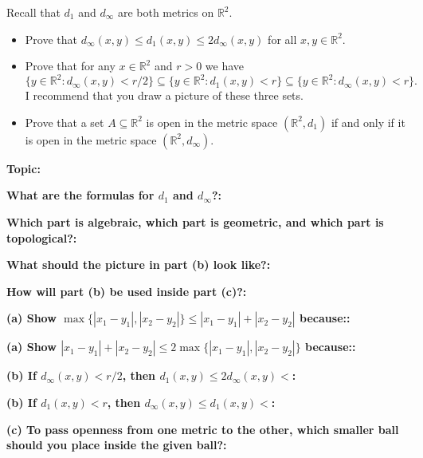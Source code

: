 \documentclass[12pt]{article}
\newcommand{\fillfield}[1]{%
  \par\noindent\textbf{#1:}\enspace\hrulefill\par\vspace{3pt}%
}
\begin{document}
\begin{tcolorbox}[
  enhanced, breakable,
  colback  = probblue,
  colframe = blue!55!black,
  fonttitle = \bfseries,
  title = {\textsc{Problem Statement}\hfill Homework 8, Problem 2}
]
Recall that $d_1$ and $d_\infty$ are both metrics on $\mathbb{R}^2$.
\begin{itemize}[nosep, leftmargin=1.8em]
  \item[(a)] Prove that $d_\infty(x, y) \leq d_1(x, y) \leq 2d_\infty(x, y)$ for all
    $x, y \in \mathbb{R}^2$.
  \item[(b)] Prove that for any $x \in \mathbb{R}^2$ and $r > 0$ we have
\[
  \{y \in \mathbb{R}^2 : d_\infty(x, y) < r/2\}
  \subseteq
  \{y \in \mathbb{R}^2 : d_1(x, y) < r\}
  \subseteq
  \{y \in \mathbb{R}^2 : d_\infty(x, y) < r\}.
\]
  I recommend that you draw a picture of these three sets.
  \item[(c)] Prove that a set $A \subseteq \mathbb{R}^2$ is open in the metric space
    $(\mathbb{R}^2, d_1)$ if and only if it is open in the metric space $(\mathbb{R}^2, d_\infty)$.
\end{itemize}
\end{tcolorbox}

\bigskip

\begin{tcolorbox}[
  enhanced, breakable,
  colback  = pass1green,
  colframe = green!55!black,
  fonttitle = \bfseries,
  title = {Pass 1 \enspace\textbf{--}\enspace First Diagnosis}
]
\fillfield{Topic}
\fillfield{What are the formulas for $d_1$ and $d_\infty$?}
\fillfield{Which part is algebraic, which part is geometric, and which part is topological?}
\fillfield{What should the picture in part (b) look like?}
\fillfield{How will part (b) be used inside part (c)?}
\end{tcolorbox}

\bigskip

\begin{tcolorbox}[
  enhanced, breakable,
  colback  = pass2yellow,
  colframe = yellow!65!black,
  fonttitle = \bfseries,
  title = {Pass 2 \enspace\textbf{--}\enspace Proof Recipe Card}
]
\fillfield{(a) Show $\max\{|x_1-y_1|,|x_2-y_2|\} \leq |x_1-y_1|+|x_2-y_2|$ because:}
\fillfield{(a) Show $|x_1-y_1|+|x_2-y_2| \leq 2\max\{|x_1-y_1|,|x_2-y_2|\}$ because:}
\fillfield{(b) If $d_\infty(x,y)<r/2$, then $d_1(x,y)\leq 2d_\infty(x,y) <$}
\fillfield{(b) If $d_1(x,y)<r$, then $d_\infty(x,y)\leq d_1(x,y) <$}
\fillfield{(c) To pass openness from one metric to the other, which smaller ball should you place inside the given ball?}
\end{tcolorbox}
\end{document}
